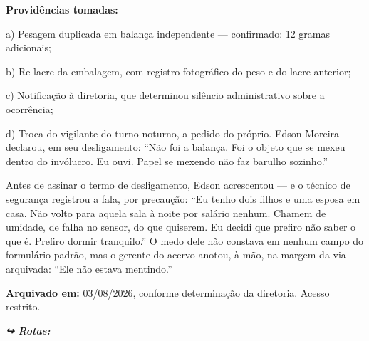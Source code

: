 \noindent \textbf{Providências tomadas:}

\noindent a) Pesagem duplicada em balança independente --- confirmado: 12 gramas adicionais;

\noindent b) Re-lacre da embalagem, com registro fotográfico do peso e do lacre anterior;

\noindent c) Notificação à diretoria, que determinou silêncio administrativo sobre a ocorrência;

\noindent d) Troca do vigilante do turno noturno, a pedido do próprio. Edson Moreira declarou, em seu desligamento: \textquotedblleft{}Não foi a balança. Foi o objeto que se mexeu dentro do invólucro. Eu ouvi. Papel se mexendo não faz barulho sozinho.\textquotedblright{}

\noindent Antes de assinar o termo de desligamento, Edson acrescentou --- e o técnico de segurança registrou a fala, por precaução: \textquotedblleft{}Eu tenho dois filhos e uma esposa em casa. Não volto para aquela sala à noite por salário nenhum. Chamem de umidade, de falha no sensor, do que quiserem. Eu decidi que prefiro não saber o que é. Prefiro dormir tranquilo.\textquotedblright{} O medo dele não constava em nenhum campo do formulário padrão, mas o gerente do acervo anotou, à mão, na margem da via arquivada: \textquotedblleft{}Ele não estava mentindo.\textquotedblright{}

\noindent \textbf{Arquivado em:} 03/08/2026, conforme determinação da diretoria. Acesso restrito.

\vspace{0.5em}
\noindent\textit{\textbf{↪ Rotas:}  \rotasep {} \rotasep {}}
